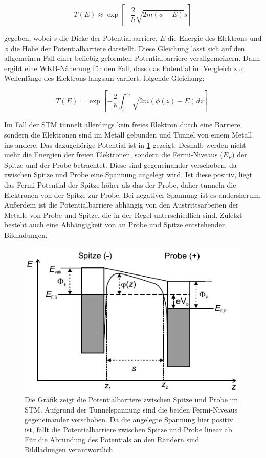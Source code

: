 \documentclass[
	a4paper,
	12pt,
	pagesize,
	ngerman
]{scrartcl}
\begin{document}
\begin{equation}
	T(E) \approx \exp [-\frac{2}{\hbar}\sqrt{2m(\phi - E)}s]
\end{equation}

gegeben, wobei $s$ die Dicke der Potentialbarriere, $E$ die Energie des Elektrons und $\phi$ die Höhe der Potentialbarriere darstellt. Diese Gleichung lässt sich auf den allgemeinen Fall einer beliebig geformten Potentialbarriere verallgemeinern. Dann ergibt eine WKB-Näherung für den Fall, dass das Potential im Vergleich zur Wellenlänge des Elektrons langsam variiert, folgende Gleichung:

\begin{equation}
	T(E) = \exp [-\frac{2}{\hbar} \int_{z_1}^{z_2}\sqrt{2m(\phi(z) - E)}dz].
\end{equation}

Im Fall der STM tunnelt allerdings kein freies Elektron durch eine Barriere, sondern die Elektronen sind im Metall gebunden und Tunnel von einem Metall ins andere. Das dazugehörige Potential ist in \cref{barrier} gezeigt. Deshalb werden nicht mehr die Energien der freien Elektronen, sondern die Fermi-Niveaus ($E_F$) der Spitze und der Probe betrachtet. Diese sind gegeneinander verschoben, da zwischen Spitze und Probe eine Spannung angelegt wird. Ist diese positiv, liegt das Fermi-Potential der Spitze höher als das der Probe, daher tunneln die Elektronen von der Spitze zur Probe. Bei negativer Spannung ist es andersherum. Außerdem ist die Potentialbarriere abhängig von den Austrittsarbeiten der Metalle von Probe und Spitze, die in der Regel unterschiedlich sind. Zuletzt besteht auch eine Abhängigkeit von an Probe und Spitze entstehenden Bildladungen.

\begin{figure}[h!]
	\centering
	\includegraphics[scale = 1.2]{barrier.png}
	\caption{Die Grafik zeigt die Potentialbarriere zwischen Spitze und Probe im STM. Aufgrund der Tunnelspannung sind die beiden Fermi-Niveaus gegeneinander verschoben. Da die angelegte Spannung hier positiv ist, fällt die Potentialbarriere zwischen Spitze und Probe linear ab. Für die Abrundung des Potentials an den Rändern sind Bildladungen verantwortlich.}
	\label{barrier}
\end{figure}
\end{document}

